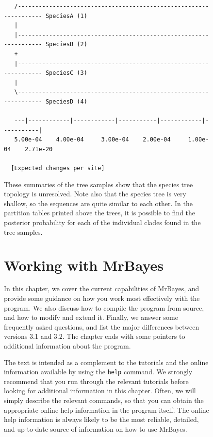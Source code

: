 \documentclass[12pt]{book}
\newcommand{\ttt}[1]{\texttt{#1}}
\begin{document}
\begin{figure}[h]
\begin{singlespacing}
\begin{verbatim}
   /------------------------------------------------------------------ SpeciesA (1)
   |                                                                               
   |------------------------------------------------------------------ SpeciesB (2)
   +                                                                               
   |------------------------------------------------------------------ SpeciesC (3)
   |                                                                               
   \------------------------------------------------------------------ SpeciesD (4)
                                                                                   
   ---|------------|------------|-----------|------------|-----------|             
   5.00e-04    4.00e-04     3.00e-04    2.00e-04     1.00e-04    2.71e-20 
 
  [Expected changes per site]
\end{verbatim}
\end{singlespacing}
\normalsize

These summaries of the tree samples show that the species tree topology is unresolved. Note also
that the species tree is very shallow, so the sequences are quite similar to each other. In the
partition tables printed above the trees, it is possible to find the posterior probability for each
of the individual clades found in the tree samples.


\chapter{Working with MrBayes}
\label{advancedTopics}

In this chapter, we cover the current capabilities of MrBayes, and provide some guidance on how you
work most effectively with the program. We also discuss how to compile the program from source, and
how to modify and extend it. Finally, we answer some frequently asked questions, and list the major
differences between versions 3.1 and 3.2. The chapter ends with some pointers to additional
information about the program.

The text is intended as a complement to the tutorials and the online information available by using
the \ttt{help} command. We strongly recommend that you run through the relevant tutorials before
looking for additional information in this chapter. Often, we will simply describe the relevant
commands, so that you can obtain the appropriate online help information in the program itself. The
online help information is always likely to be the most reliable, detailed, and up-to-date source
of information on how to use MrBayes.


\end{figure}
\end{document}
